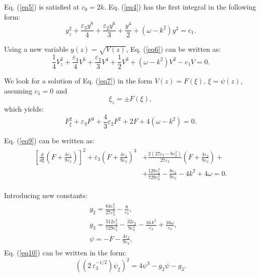 \documentclass[preprint,12pt]{elsarticle}
\begin{document}
Eq. (\ref{eq5}) is satisfied at \(c_{0}=2k\). Eq. (\ref{eq4}) has the first integral in the following form:
\begin{equation} \label{eq6}
y_{z}^{2}+\frac{\varepsilon_{3} y^{8} }{4}+\frac{\varepsilon_{2} y^{6} }{3}+\frac{ y^{4} }{2}+\left(\omega-k^{2}\right) y^{2} =c_{1}.
\end{equation}

Using a new variable \(y(z)=\sqrt{V(z)}\), Eq. (\ref{eq6}) can be written as:
\begin{equation} \label{eq7}
\frac{ 1}{4}V_{z}^{2}+\frac{\varepsilon_{3}}{4}V^{5} +\frac{\varepsilon_{2}}{3}V^{4} +\frac{1}{2}V^{3}+\left( \omega- k^{2}\right)V^{2}-c_{1} V=0.
\end{equation}

We look for a solution of Eq. (\ref{eq7}) in the form \(V(z)=F(\xi),\,\xi=\psi(z)\), assuming \(c_{1}=0\) and
\begin{equation} \label{eq8}
\xi_{z}=\pm F(\xi),
\end{equation}
which yields:
\begin{equation}\label{eq9}
F_{\xi}^{2}+\varepsilon_{3}F^{3}+\frac{4 }{3}\varepsilon_{2} F^{2}+2 F+4\left(\omega -k^{2}\right)=0.
\end{equation}

Eq. (\ref{eq9}) can be written as:
\begin{equation}\label{eq10}
\begin{aligned}
\begin{split}
\left[\frac{d}{d\xi}\left(F+\frac{4 \varepsilon_{2}}{9 \varepsilon_{3}}\right)\right]^{2}+
\varepsilon_{3}\left(F+\frac{4 \varepsilon_{2}}{9 \varepsilon_{3}}\right)^{3}&+
\frac{2 (27 \varepsilon_{3} -8 \varepsilon_{2}^{2}) }{27 \varepsilon_{3}}\left(F+\frac{4 \varepsilon_{2}}{9 \varepsilon_{3}}\right)+\\
&+\frac{128 \varepsilon_{2}^{3}}{729 \varepsilon_{3}^{2}}-\frac{8 \varepsilon_{2}}{9 \varepsilon_{3}}-4 k^{2}+4 \omega=0.
\end{split}
\end{aligned}
\end{equation}

Introducing new constants:
\begin{equation}
\begin{aligned}
\begin{split}
&g_{2}=\frac{64 \varepsilon_{2}^{2}}{27 \varepsilon_{3}^{2}}-\frac{8 }{\varepsilon_{3}},\\
&g_{3}=\frac{512 \varepsilon_{2}^{3}}{729 \varepsilon_{3}^{3}}
-\frac{32 \varepsilon_{2}}{9 \varepsilon_{3}^{2}}
-\frac{16 \,k^{2}}{\varepsilon_{3}}
+\frac{16 \omega}{\varepsilon_{3}},\\
&\psi=-F-\frac{4 \varepsilon_{2}}{9 \varepsilon_{3}},
\end{split}
\end{aligned}
\end{equation}
Eq. (\ref{eq10}) can be written in the form:
\begin{equation}\label{eq12}
\left(\left(2\,\varepsilon_{3}^{-1/2}\right)\psi_{\xi}\right)^{2}=4 \psi^{3}-g_{2} \psi-g_{3}.
\end{equation}
\end{document}
